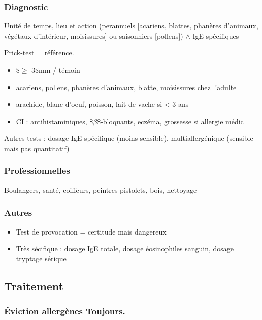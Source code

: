 \documentclass{book}
\begin{document}
\subsubsection{Diagnostic}
\label{sec:org1acabc5}
Unité de temps, lieu et action (perannuels [acariens,
blattes, phanères d'animaux, végétaux d'intérieur, moisissures] ou saisonniers
[pollens]) \(\wedge\) IgE spécifiques

Prick-test = référence.

\begin{itemize}
\item \$\diameter \(\ge\) 3\$mm / témoin
\item acariens, pollens, phanères d'animaux, blatte, moisissures chez l'adulte
\item arachide, blanc d'oeuf, poisson, lait de vache si < 3 ans
\item CI : antihistaminiques, \$\(\beta\)\$-bloquants, eczéma, grossesse si
allergie médic
\end{itemize}


Autres tests : dosage IgE spécifique (moins sensible), multiallergénique (sensible mais
pas quantitatif)

\subsubsection{Professionnelles}
\label{sec:org77d4f34}
Boulangers, santé, coiffeurs, peintres pistolets, bois, nettoyage

\subsubsection{Autres}
\label{sec:org151783b}
\begin{itemize}
\item Test de provocation = certitude mais dangereux
\item Très sécifique : dosage IgE totale, dosage éosinophiles sanguin, dosage tryptage sérique
\end{itemize}

\subsection{Traitement}
\label{sec:org833f0c6}
\subsubsection{Éviction allergènes Toujours.}
\label{sec:org7231175}
\end{document}
